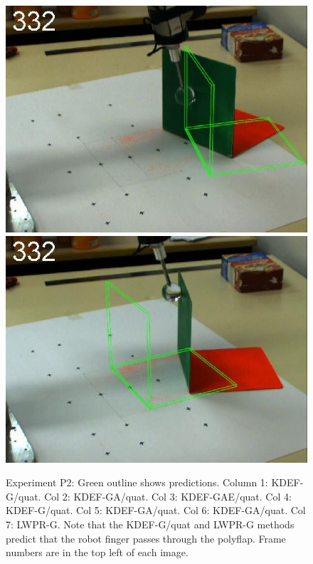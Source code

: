 \begin{figure}[tb]
{\includegraphics[width=\imgBXwid]{./B2_2exp_38_5}
\includegraphics[width=\imgBXwid]{./B2_LWPR1_58_5}
}
\caption
{Experiment P2: Green outline shows predictions. Column 1: KDEF-G/quat. Col 2:
KDEF-GA/quat. Col 3: KDEF-GAE/quat. Col 4: KDEF-G/quat. Col 5:
KDEF-GA/quat. Col 6: KDEF-GA/quat. Col 7:  LWPR-G.
Note that the KDEF-G/quat and LWPR-G methods predict
that the robot finger passes through the polyflap.
Frame numbers are in the top left of each image.
}
\label{fig:ExperimentA}
\end{figure}

